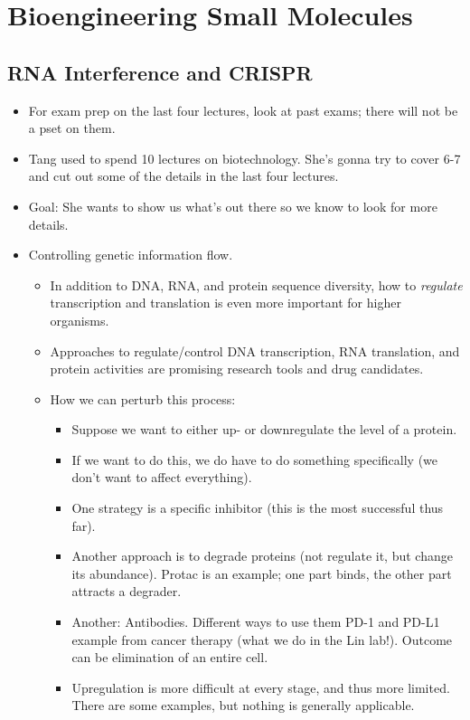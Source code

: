 \documentclass[../notes.tex]{subfiles}
\begin{document}
\chapter{Bioengineering Small Molecules}
\section{RNA Interference and CRISPR}
\begin{itemize}
    \item {}For exam prep on the last four lectures, look at past exams; there will not be a pset on them.
    \item Tang used to spend 10 lectures on biotechnology. She's gonna try to cover 6-7 and cut out some of the details in the last four lectures.
    \item Goal: She wants to show us what's out there so we know to look for more details.
    \item Controlling genetic information flow.
    \begin{itemize}
        \item In addition to DNA, RNA, and protein sequence diversity, how to \emph{regulate} transcription and translation is even more important for higher organisms.
        \item Approaches to regulate/control DNA transcription, RNA translation, and protein activities are promising research tools and drug candidates.
        \item How we can perturb this process:
        \begin{itemize}
            \item Suppose we want to either up- or downregulate the level of a protein.
            \item If we want to do this, we do have to do something specifically (we don't want to affect everything).
            \item One strategy is a specific inhibitor (this is the most successful thus far).
            \item Another approach is to degrade proteins (not regulate it, but change its abundance). Protac is an example; one part binds, the other part attracts a degrader.
            \item Another: Antibodies. Different ways to use them PD-1 and PD-L1 example from cancer therapy (what we do in the Lin lab!). Outcome can be elimination of an entire cell.
            \item Upregulation is more difficult at every stage, and thus more limited. There are some examples, but nothing is generally applicable.

\end{itemize}
\end{itemize}
\end{itemize}
\end{document}
